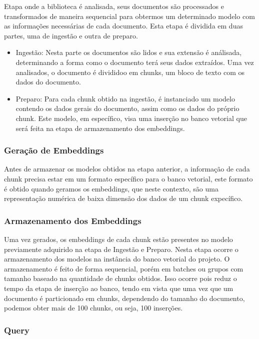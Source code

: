 \documentclass[a4paper, 12pt]{article}
\begin{document}
    Etapa onde a biblioteca é analisada, seus documentos são processados e transformados de maneira sequencial para obtermos um determinado modelo com as informações necessárias de cada documento. Esta etapa é dividida em duas partes, uma de ingestão e outra de preparo.

    \begin{itemize}
        \item Ingestão: Nesta parte os documentos são lidos e sua extensão é análisada, determinando a forma como o documento terá seus dados extraídos. Uma vez analisados, o documento é divididoo em chunks, um bloco de texto com os dados do documento.
        \item Preparo: Para cada chunk obtido na ingestão, é instanciado um modelo contendo os dados gerais do documento, assim como os dados do próprio chunk. Este modelo, em específico, visa uma inserção no banco vetorial que será feita na etapa de armazenamento dos embeddings.
    \end{itemize}

    \subsubsection{Geração de Embeddings}
    
    Antes de armazenar os modelos obtidos na etapa anterior, a informação de cada chunk precisa estar em um formato específico para o banco vetorial, este formato é obtido quando geramos os embeddings, que neste contexto, são uma representação numérica de baixa dimensão dos dados de um chunk expecífico.

    \subsubsection{Armazenamento dos Embeddings}
    
    Uma vez gerados, os embeddings de cada chunk estão presentes no modelo previamente adquirido na etapa de Ingestão e Preparo. Nesta etapa ocorre o armazenamento dos modelos na instância do banco vetorial do projeto. O armazenamento é feito de forma sequencial, porém em batches ou grupos com tamanho baseado na quantidade de chunks obtidos. Isso ocorre pois reduz o tempo da etapa de inserção ao banco, tendo em vista que uma vez que um documento é particionado em chunks, dependendo do tamanho do documento, podemos obter mais de 100 chunks, ou seja, 100 inserções.

    \subsubsection{Query}
    
\end{document}
